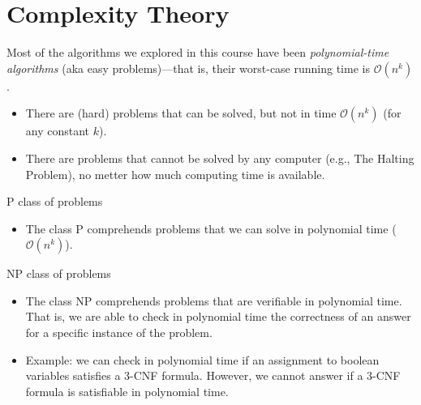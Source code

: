 \section{Complexity Theory}

\begin{frame}
  Most of the algorithms we explored in this course
  have been \emph{polynomial-time algorithms} (aka easy problems)\pause---that is,
  their worst-case running time is $\mathcal{O}(n^k)$.

    \begin{itemize}
     \item There are (hard) problems that can be solved, but not in time $\mathcal{O}(n^k)$ (for any constant $k$). 
     \item There are problems that cannot be solved by any computer (e.g., {\color{blue}The Halting Problem}), no metter
       how much computing time is available. 
    \end{itemize}
\end{frame}

\begin{frame}{P class of problems}
  \begin{itemize}
    \item The class P comprehends problems that we can solve in
    polynomial time ($\mathcal{O}(n^k)$).
  \end{itemize}    
\end{frame}


\begin{frame}{NP class of problems}
  \begin{itemize}
  \item The class NP comprehends problems that are verifiable
    in polynomial time. \pause That is, we are able to {\color{blue}check
    in polynomial time} the correctness of an answer for a
    specific instance of the problem.
  \item Example: we can check in polynomial time if an assignment to boolean variables
    satisfies a 3-CNF formula. However, we cannot answer if a 3-CNF formula is
    satisfiable in polynomial time. 
  \end{itemize}
\end{frame}  

